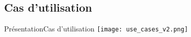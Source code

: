 \subsection{Cas d'utilisation}%

\begin{frame}{Présentation}{Cas d'utilisation}
    \texttt{[image: use\_cases\_v2.png]}
\end{frame}